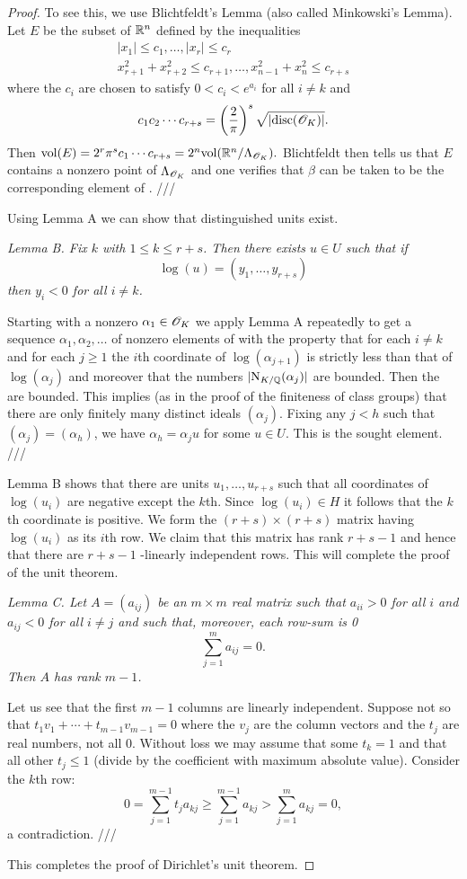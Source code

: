 \documentclass[10pt,a4paper,reqno]{amsart}
\begin{document}
\begin{proof}
To see this, we use Blichtfeldt's Lemma (also called Minkowski's Lemma). Let
$E$ be the subset of $\mathbb{R}^n$ defined by the inequalities
\begin{gather*}
  |x_1| \le c_1, \dots , |x_r| \le c_r\\
  x_{r+1}^2 + x_{r+2}^2 \le c_{r+1} , \dots ,x_{n-1}^2 + x_n^2
  \le c_{r+s}
\end{gather*} where the $c_i$ are chosen to satisfy \(0 < c_i < e^{a_i}\) for
all $i\neq k$ and \[c_1 c_2 \cdots c_{r+s} = \left( \frac{2}{\pi} \right)^s
\sqrt{|\mathrm{disc}(\mathscr{O}_K)|}. \] Then $\mathrm{vol}(E) = 2^r \pi^s c_1 \cdots c_{r+s} = 2^{n}
\mathrm{vol}(\mathbb{R}^n/\Lambda_{\mathscr{O}_K}).$ Blichtfeldt then tells us that $E$ contains a
nonzero point of $\Lambda_{\mathscr{O}_K}$ and one verifies that $\beta$ can be taken to
be the corresponding element of \OK. ///

Using Lemma A we can show that distinguished units exist.

\textsl{Lemma B. Fix $k$ with $1 \le k \le r+s$. Then there exists $u\in U$
such that if \[\log(u) = (y_1, \dots, y_{r+s})\] then $y_i < 0$ for all
$i\neq k$.}

Starting with a nonzero $\alpha_1\in \mathscr{O}_K$ we apply Lemma A repeatedly to get a
sequence $\alpha_1,\alpha_2,\dots$ of nonzero elements of \OK{} with the
property that for each $i\neq k$ and for each $j\ge 1$ the $i$th coordinate of
$\log(\alpha_{j+1})$ is strictly less than that of $\log(\alpha_j)$ and
moreover that the numbers $|\mathrm{N}_{K/\mathbb{Q}}(\alpha_j)|$ are bounded. Then the
 are bounded. This implies (as in the proof of the finiteness
of class groups) that there are only finitely many distinct ideals
$(\alpha_j)$. Fixing any $j < h$ such that $(\alpha_j) = (\alpha_h)$, we have
$\alpha_h = \alpha_j u$ for some $u\in U.$ This is the sought element. ///

Lemma B shows that there are units $u_1,\dots,u_{r+s}$ such that all
coordinates of $\log(u_i)$ are negative except the $k$th. Since $\log(u_i)\in
H$ it follows that the $k$th coordinate is positive. We form the $(r+s)\times
(r+s)$ matrix having $\log(u_i)$ as its $i$th row. We claim that this matrix
has rank $r+s-1$ and hence that there are $r+s-1$ \R-linearly independent rows.
This will complete the proof of the unit theorem.

\textsl{Lemma C. Let $A = (a_{ij})$ be an $m\times m$ real matrix such that
$a_{ii} > 0$ for all $i$ and $a_{ij} < 0$ for all $i\neq j$ and such that,
moreover, each row-sum is 0 \[\sum_{j=1}^m a_{ij} = 0.\] Then $A$ has rank
$m-1$.}

Let us see that the first $m-1$ columns are linearly independent. Suppose not
so that $t_1 v_1 + \cdots + t_{m-1} v_{m-1} = 0$ where the $v_j$ are the column
vectors and the $t_j$ are real numbers, not all 0. Without loss we may assume
that some $t_k=1$ and that all other $t_j \le 1$ (divide by the coefficient
with maximum absolute value). Consider the $k$th row: \[0 = \sum_{j=1}^{m-1}
t_ja_{kj} \ge \sum_{j=1}^{m-1} a_{kj} > \sum_{j=1}^m a_{kj} = 0,\] a
contradiction. ///

This completes the proof of Dirichlet's unit theorem.
\end{proof}
\end{document}
